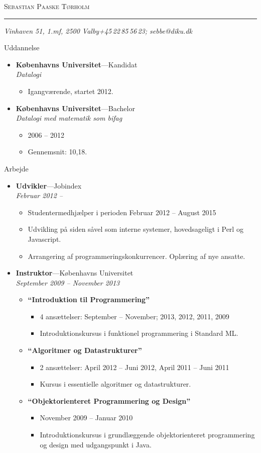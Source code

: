 \documentclass[11pt,oneside,a4paper]{article}
\makeatletter
\newcommand{\name}{Sebastian Paaske Tørholm}
\newcommand{\addr}{Vinhaven 51, 1.mf, 2500 Valby}
\newcommand{\phone}{+45\,22\,85\,56\,23}
\newcommand{\email}{sebbe@diku.dk}
\newcommand{\bigname}[1]{
    \begin{center}\fontfamily{phv}\selectfont\Huge\scshape#1\end{center}
}
\newenvironment{ressection}[1]{
    \vspace{4pt}
    {\fontfamily{phv}\selectfont\Large#1}
    \begin{itemize}
    \vspace{3pt}
}{
    \end{itemize}
}
\newcommand{\resitem}[1]{
    \vspace{-4pt}
    \item \begin{flushleft} #1 \end{flushleft}
}
\newcommand{\ressubitem}[1]{
    \vspace{-1pt}
    \item \begin{flushleft} #1 \end{flushleft}
}
\newcommand{\resbigitem}[3]{
    \vspace{-5pt}
    \item
    \textbf{#1}---#2 \\
    \textit{#3}
}
\newenvironment{ressubsec}[3]{
    \resbigitem{#1}{#2}{#3}
    \vspace{-2pt}
    \begin{itemize}
}{
    \end{itemize}
}
\newenvironment{reslist}[1]{
    \resitem{\textbf{#1}}
    \vspace{-2pt}
    \begin{itemize}
}{
    \end{itemize}
}
\makeatother
\begin{document}
 \selectfont

\bigname{\name}

\vspace{-8pt} \rule{\textwidth}{1pt}

\vspace{-1pt} {\small\itshape \addr \hfill \phone; \email}

\vspace{8 pt}




\begin{ressection}{Uddannelse}
    \begin{ressubsec}{Københavns Universitet}{Kandidat}{Datalogi}
        \ressubitem{Igangværende, startet 2012.}
    \end{ressubsec}

    \begin{ressubsec}{Københavns Universitet}{Bachelor}{Datalogi med matematik som bifag}
        \ressubitem{2006 -- 2012}
        \ressubitem{Gennemsnit: 10,18.}
    \end{ressubsec}

\end{ressection}


\begin{ressection}{Arbejde}
    \begin{ressubsec}{Udvikler}{Jobindex}{Februar 2012 -- }
        \ressubitem{Studentermedhjælper i perioden Februar 2012 -- August 2015}
        \ressubitem{Udvikling på siden såvel som interne systemer, hovedsageligt i Perl og Javascript.}
        \ressubitem{Arrangering af programmeringskonkurrencer. Oplæring af nye ansatte.}
    \end{ressubsec}

    \begin{ressubsec}{Instruktor}{Københavns Universitet}{September 2009 -- November 2013}
        \begin{reslist}{``Introduktion til Programmering''}
            \ressubitem{4 ansættelser: September -- November; 2013, 2012, 2011, 2009}
            \ressubitem{Introduktionskursus i funktionel programmering i Standard ML.}
        \end{reslist}
        \begin{reslist}{``Algoritmer og Datastrukturer''}
            \ressubitem{2 ansættelser: April 2012 -- Juni 2012, April 2011 -- Juni 2011}
            \ressubitem{Kursus i essentielle algoritmer og datastrukturer.}
        \end{reslist}
        \begin{reslist}{``Objektorienteret Programmering og Design''}
            \ressubitem{November 2009 -- Januar 2010}
            \ressubitem{Introduktionskursus i grundlæggende objektorienteret programmering og design med udgangspunkt i Java.}
        \end{reslist}
    \end{ressubsec}

\end{ressection}
\end{document}
